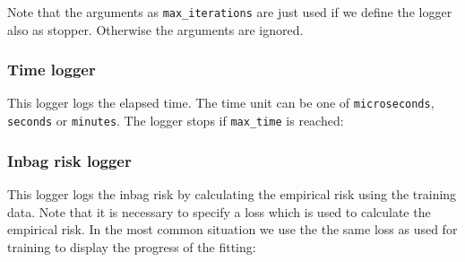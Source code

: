 \documentclass[]{article}
\newenvironment{Shaded}{\begin{snugshade}}{\end{snugshade}}
\newcommand{\KeywordTok}[1]{\textcolor[rgb]{0.13,0.29,0.53}{\textbf{#1}}}
\newcommand{\DataTypeTok}[1]{\textcolor[rgb]{0.13,0.29,0.53}{#1}}
\newcommand{\DecValTok}[1]{\textcolor[rgb]{0.00,0.00,0.81}{#1}}
\newcommand{\FloatTok}[1]{\textcolor[rgb]{0.00,0.00,0.81}{#1}}
\newcommand{\StringTok}[1]{\textcolor[rgb]{0.31,0.60,0.02}{#1}}
\newcommand{\OtherTok}[1]{\textcolor[rgb]{0.56,0.35,0.01}{#1}}
\newcommand{\OperatorTok}[1]{\textcolor[rgb]{0.81,0.36,0.00}{\textbf{#1}}}
\newcommand{\NormalTok}[1]{#1}
\begin{document}
\begin{Shaded}
\end{Shaded}

Note that the arguments as \texttt{max\_iterations} are just used if we
define the logger also as stopper. Otherwise the arguments are ignored.

\subsubsection{Time logger}\label{time-logger}

This logger logs the elapsed time. The time unit can be one of
\texttt{microseconds}, \texttt{seconds} or \texttt{minutes}. The logger
stops if \texttt{max\_time} is reached:

\begin{Shaded}
\end{Shaded}

\subsubsection{Inbag risk logger}\label{inbag-risk-logger}

This logger logs the inbag risk by calculating the empirical risk using
the training data. Note that it is necessary to specify a loss which is
used to calculate the empirical risk. In the most common situation we
use the the same loss as used for training to display the progress of
the fitting:

\begin{Shaded}
\end{Shaded}
\end{document}
